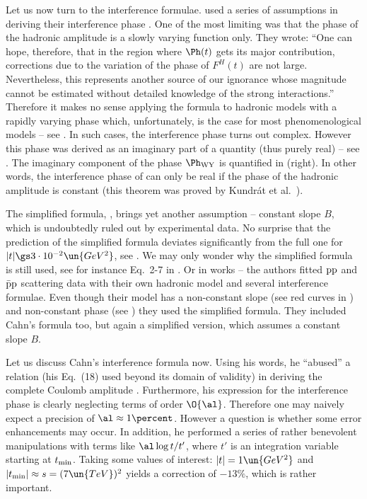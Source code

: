 Let us now turn to the interference formulae. \WaY{} used a series of assumptions in deriving their interference phase . One of the most limiting was that the phase of the hadronic amplitude is a slowly varying function only. They wrote: ``One can hope, therefore, that in the region where $\Ph(t)$ gets its major contribution, corrections due to the variation of the phase of $F^H(t)$ are not large. Nevertheless, this represents another source of our ignorance whose magnitude cannot be estimated without detailed knowledge of the strong interactions.'' Therefore it makes no sense applying the \WaY{} formula to hadronic models with a rapidly varying phase which, unfortunately, is the case for most phenomenological models -- see . In such cases, the interference phase  turns out complex. However this phase was derived as an imaginary part of a quantity (thus purely real) -- see . The imaginary component of the phase $\Ph_{\rm WY}$ is quantified in  (right). In other words, the interference phase of \WaY{} can only be real if the phase of the hadronic amplitude is constant (this theorem was proved by Kundr\' at et al.\ ).

The simplified \WaY{} formula, , brings yet another assumption -- constant slope $B$, which is undoubtedly ruled out by experimental data. No surprise that the prediction of the simplified formula deviates significantly from the full one for $|t| \gs 3\cdot 10^{-2}\un{GeV^2}$, see . We may only wonder why the simplified formula is still used, see for instance Eq.~2-7 in .
Or in works  -- the authors fitted $\rm pp$ and $\rm\bar pp$ scattering data with their own hadronic model and several interference formulae. Even though their model has a non-constant slope (see red curves in ) and non-constant phase (see ) they used the simplified \WY{} formula. They included Cahn's formula too, but again a simplified version, which assumes a constant slope $B$.


Let us discuss Cahn's interference formula  now. Using his words, he ``abused'' a relation (his Eq.~(18) used beyond its domain of validity) in deriving the complete Coulomb amplitude . Furthermore, his expression for the interference phase is clearly neglecting terms of order $\O{\al}$. Therefore one may naively expect a precision of $\al\approx 1\percent$. However a question is whether some error enhancements may occur. In addition, he performed a series of rather benevolent manipulations with terms like $\al \log t/ t'$, where $t'$ is an integration variable starting at $t_{\rm min}$. Taking some values of interest: $|t| = 1\un{GeV^2}$ and $|t_{\rm min}| \approx s = (7\un{TeV})^2$ yields a correction of $-13\percent$, which is rather important.

